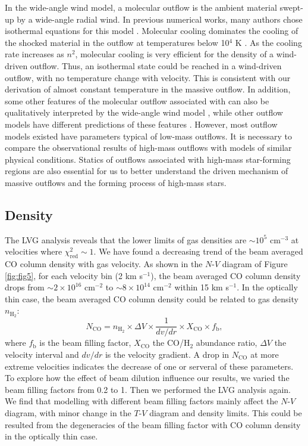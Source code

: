 In the wide-angle wind model, a molecular outflow is the ambient material swept-up by a wide-angle radial wind. In previous numerical works, many authors chose isothermal equations for this model \citep{1996ApJ...472..211L,2001ApJ...557..429L}. Molecular cooling dominates the cooling of the shocked material in the outflow at temperatures below 10$^4$ K \citep{1997IAUS..182..181H}. As the cooling rate increases as $n^2$, molecular cooling is very efficient for the density of a wind-driven outflow. Thus, an isothermal state could be reached in a wind-driven outflow, with no temperature change with velocity. This is consistent with our derivation of almost constant temperature in the massive  outflow. In addition, some other features of the molecular outflow associated with  can also be qualitatively interpreted by the wide-angle wind model \citep{2009ApJ...696...66Q}, while other outflow models have different predictions of these features \citep{2007prpl.conf..245A}. However, most outflow models existed have parameters typical of low-mass outflows. It is necessary to compare the observational results of high-mass outflows with models of similar physical conditions. Statics of outflows associated with high-mass star-forming regions are also essential for us to better understand the driven mechanism of massive outflows and the forming process of high-mass stars.

\subsection{Density}

The LVG analysis reveals that the lower limits of gas densities are $\sim 10^5$ cm$^{-3}$ at velocities where $\chi^2_{\mathrm{red}} \sim 1$. We have found a decreasing trend of the beam averaged CO column density with gas velocity. As shown in the $N$-$V$ diagram of Figure \ref{fig:fig5}, for each velocity bin (2 km s$^{-1}$), the beam averaged CO column density drops from $\sim 2 \times  10^{16} $ cm$^{-2}$ to $\sim 8 \times 10^{14}$ cm$^{-2}$ within 15 km s$^{-1}$. In the optically thin case, the beam averaged CO column density could be related to gas density $n_{\mathrm{H}_2}$: 
\begin{equation}
N_{\mathrm{CO}} = n_{\mathrm{H}_2} \times \Delta V \times \frac{1}{dv/dr} \times X_{\mathrm{CO}} \times f_{\mathrm{b}}, 
\end{equation}
where $f_{\mathrm{b}}$ is the beam filling factor, $X_{\mathrm{CO}}$ the CO/H$_2$ abundance ratio, $\Delta V$ the velocity interval and $dv/dr$ is the velocity gradient. A drop in $N_{\mathrm{CO}}$ at more extreme velocities indicates the decrease of one or serveral of these parameters. 
To explore how the effect of beam dilution influence our results, we varied the beam filling factors from 0.2 to 1. Then we performed the LVG analysis again. We find that modelling with different beam filling factors mainly affect the $N$-$V$ diagram, with minor change in the $T$-$V$ diagram and density limits. This could be resulted from the degeneracies of the beam filling factor with CO column density in the optically thin case. 

